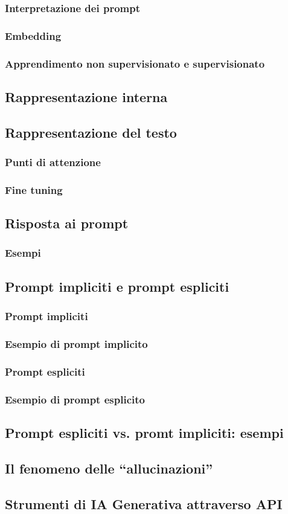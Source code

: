         \subsubsection{Interpretazione dei prompt}
        \subsubsection{Embedding}
        \subsubsection{Apprendimento non supervisionato e supervisionato}
    \subsection{Rappresentazione interna}
    \subsection{Rappresentazione del testo}
        \subsubsection{Punti di attenzione}
        \subsubsection{Fine tuning}
    \subsection{Risposta ai prompt}
        \subsubsection{Esempi}
    \subsection{Prompt impliciti e prompt espliciti}
        \subsubsection{Prompt impliciti}
        \subsubsection{Esempio di prompt implicito}
        \subsubsection{Prompt espliciti}
        \subsubsection{Esempio di prompt esplicito}
    \subsection{Prompt espliciti vs. promt impliciti: esempi}
    \subsection{Il fenomeno delle ``allucinazioni''}
    \subsection{Strumenti di IA Generativa attraverso API}

